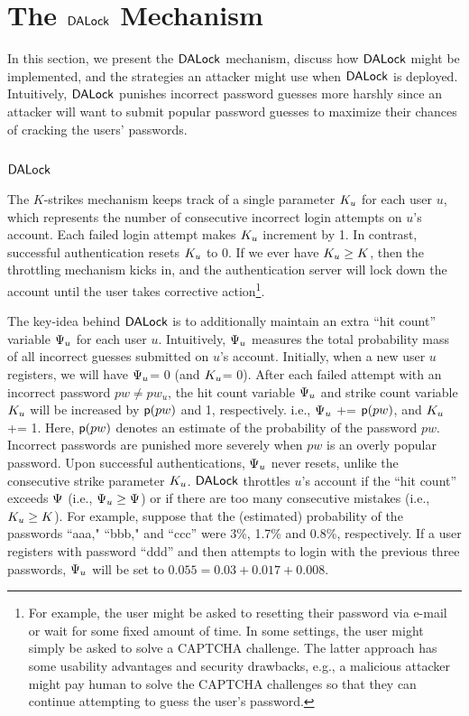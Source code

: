

\section{The $\mathsf{DALock}$ Mechanism}\label{sec:DALockAlgorithm} %
In this section, we present the $\mathsf{DALock}$ mechanism, discuss how $\mathsf{DALock}$ might be implemented, and the strategies an attacker might use when $\mathsf{DALock}$ is deployed. Intuitively, $\mathsf{DALock}$ punishes incorrect password guesses more harshly since an attacker will want to submit popular password guesses to maximize their chances of cracking the users' passwords.

\subsection{$\mathsf{DALock}$} %
The $K$-strikes mechanism keeps track of a single parameter $K_u$ for each user $u$, which represents the number of consecutive incorrect login attempts on $u$’s account. Each failed login attempt makes $K_u$ increment by 1. In contrast, successful authentication resets $K_u$ to 0. If we ever have $K_u \geq K$, then the throttling mechanism kicks in, and the authentication server will lock down the account until the user takes corrective action\footnote{For example, the user might be asked to resetting their password via e-mail or wait for some fixed amount of time. In some settings, the user might simply be asked to solve a CAPTCHA challenge. The latter approach has some usability advantages and security drawbacks, e.g., a malicious attacker might pay human to solve the CAPTCHA challenges so that they can continue attempting to guess the user's password.}.

The key-idea behind $\mathsf{DALock}$ is to additionally maintain an extra ``hit count'' variable $\Psi_{u}$ for each user $u$. Intuitively, $\Psi_{u}$ measures the total probability mass of all incorrect guesses submitted on $u$’s account. Initially, when a new user $u$ registers, we will have $\Psi_{u}$= 0 (and $K_u$= 0). After each failed attempt with an incorrect password $pw \neq pw_u$, the hit count variable $\Psi_{u}$ and strike count variable $K_u$ will be increased by $\textsf{p}(pw)$ and 1, respectively. i.e.,  $\Psi_{u}$ += $\textsf{p}(pw)$, and $K_u$ += 1. Here, $\textsf{p}(pw)$ denotes an estimate of the probability of the password $pw$. Incorrect passwords are punished more severely when $pw$ is an overly popular password. Upon successful authentications, $\Psi_{u}$ never resets, unlike the consecutive strike parameter $K_u$. $\mathsf{DALock}$ throttles $u$'s account if the ``hit count'' exceeds $\Psi$ (i.e., $\Psi_{u} \geq \Psi$) or if there are too many consecutive mistakes (i.e., $K_{u} \geq K$). For example, suppose that the (estimated) probability of the passwords ``aaa," ``bbb," and ``ccc'' were 3\%, 1.7\% and 0.8\%, respectively. If a user registers with password ``ddd'' and then attempts to login with the previous three passwords, $\Psi_{u}$ will be set to $0.055=0.03+0.017+0.008$. 

